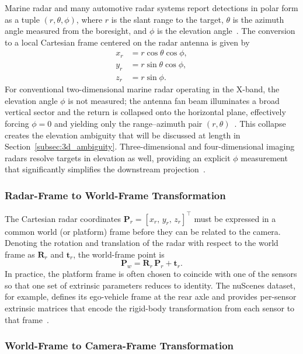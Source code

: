 Marine radar and many automotive radar systems report detections in polar form as a tuple $(r, \theta, \phi)$, where $r$ is the slant range to the target, $\theta$ is the azimuth angle measured from the boresight, and $\phi$ is the elevation angle~\cite{Skolnik2008}. The conversion to a local Cartesian frame centered on the radar antenna is given by
\begin{align}
  x_r &= r \cos\theta \cos\phi, \label{eq:polar2cart_x}\\
  y_r &= r \sin\theta \cos\phi, \label{eq:polar2cart_y}\\
  z_r &= r \sin\phi.             \label{eq:polar2cart_z}
\end{align}
For conventional two-dimensional marine radar operating in the X-band, the elevation angle $\phi$ is not measured; the antenna fan beam illuminates a broad vertical sector and the return is collapsed onto the horizontal plane, effectively forcing $\phi = 0$ and yielding only the range--azimuth pair $(r, \theta)$~\cite{Ward2006}. This collapse creates the elevation ambiguity that will be discussed at length in Section~\ref{subsec:3d_ambiguity}. Three-dimensional and four-dimensional imaging radars resolve targets in elevation as well, providing an explicit $\phi$ measurement that significantly simplifies the downstream projection~\cite{meyer2019automotive}.

\subsubsection{Radar-Frame to World-Frame Transformation}

The Cartesian radar coordinates $\mathbf{P}_r = [x_r,\, y_r,\, z_r]^\top$ must be expressed in a common world (or platform) frame before they can be related to the camera. Denoting the rotation and translation of the radar with respect to the world frame as $\mathbf{R}_r$ and $\mathbf{t}_r$, the world-frame point is
\begin{equation}\label{eq:radar2world}
  \mathbf{P}_w = \mathbf{R}_r\,\mathbf{P}_r + \mathbf{t}_r.
\end{equation}
In practice, the platform frame is often chosen to coincide with one of the sensors so that one set of extrinsic parameters reduces to identity. The nuScenes dataset, for example, defines its ego-vehicle frame at the rear axle and provides per-sensor extrinsic matrices that encode the rigid-body transformation from each sensor to that frame~\cite{Caesar2020nuScenes}.

\subsubsection{World-Frame to Camera-Frame Transformation}

